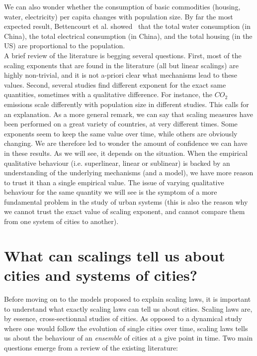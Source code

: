 We can also wonder whether the consumption of basic commodities (housing, water,
electricity) per capita changes with population size. By far the most expected
result, Bettencourt et al. showed~\cite{Bettencourt:2007} that the total water
consumption (in China), the total electrical
consumption (in China),  and the total housing (in the US) are proportional to
the population.\\


A brief review of the literature is begging several questions. First, most of
the scaling exponents that are found in the literature (all but linear scalings)
are highly non-trivial, and it is not a-priori clear what mechanisms lead to
these values. Second, several studies find different exponent for the exact same
quantities, sometimes with a qualitative difference. For instance, the $CO_2$
emissions scale differently with population size in different studies. This
calls for an explanation.  As a more general remark, we can say that scaling
measures have been performed on a great variety of countries, at very different
times. Some exponents seem to keep the same value over time, while others are
obviously changing. We are therefore led to wonder the amount of confidence we
can have in these results.  As we will see, it depends on the situation. When
the empirical qualitative behaviour (i.e. superlinear, linear or sublinear) is
backed by an understanding of the underlying mechanisms (and a model), we have
more reason to trust it than a single empirical value. The issue of varying
qualitative behaviour for the same quantity we will see is the symptom of a
more fundamental problem in the study of urban systems (this is also the reason
why we cannot trust the exact value of scaling exponent, and cannot compare them
from one system of cities to another).

\section{What can scalings tell us about cities and systems of
cities?}
\label{sub:what_can_scalings_tell_us_about_cities_and_systems_of_cities_}

Before moving on to the models proposed to explain scaling laws, 
it is important to understand what exactly scaling laws can tell us about
cities. Scaling laws are, by essence, cross-sectionnal studies of cities. As
opposed to a dynamical study where one would follow the evolution of single
cities over time, scaling laws tells us about the behaviour of an
\emph{ensemble} of cities at a give point in time. Two main questions emerge
from a review of the existing literature:

